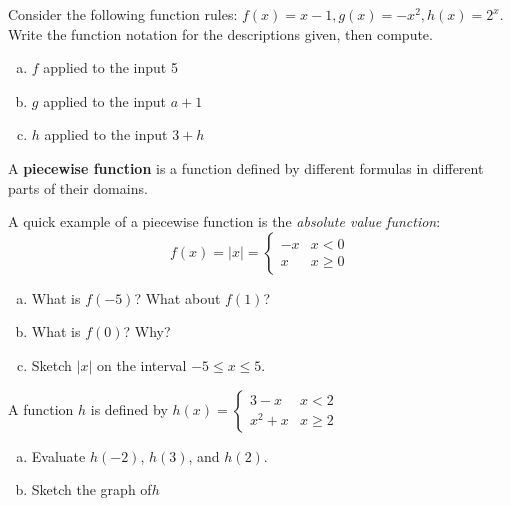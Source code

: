 \documentclass[notes]{subfiles}
\begin{document}
		\begin{ex}
			Consider the following function rules: \(f(x) = x-1, g(x) = -x^2, h(x) = 2^x\). Write the function notation for the descriptions given, then compute.
			\begin{enumerate}[(a)]
				\item \(f\) applied to the input 5
					\newpage

				\item \(g\) applied to the input \(a + 1\)

				\item \(h\) applied to the input \(3 + h\)
			\end{enumerate}
		\end{ex}	
		
		\begin{defn}
			A \textbf{piecewise function} is a function defined by different formulas in different parts of their domains.
		\end{defn}
						
		\begin{ex}
			A quick example of a piecewise function is the \emph{absolute value function}: 
				\[f(x) = |x| = \begin{cases}-x & x < 0 \\x & x \geq 0  \end{cases}\]
				
			\begin{enumerate}[(a)]
				\item What is \(f(-5)\)? What about \(f(1)\)?
					\vs{.5}
					
				\item What is \(f(0)\)?  Why?
					\vs{.5}
					
				\item Sketch \(|x|\) on the interval \(-5\leq x \leq 5\).
					\vs{1}
			\end{enumerate}
		\end{ex}
			\newpage
		
		\begin{ex}
			A function \(h\) is defined by \(h(x) = \begin{cases}3-x & x< 2\\ x^2+x & x \geq 2 \end{cases}\)
			\begin{enumerate}[(a)]
				\item Evaluate \(h(-2)\), \(h(3)\), and \(h(2)\).

					
				\item Sketch the graph of\(h\)
					\vs{1}
					
			\end{enumerate}
		\end{ex}
			
\end{document}
